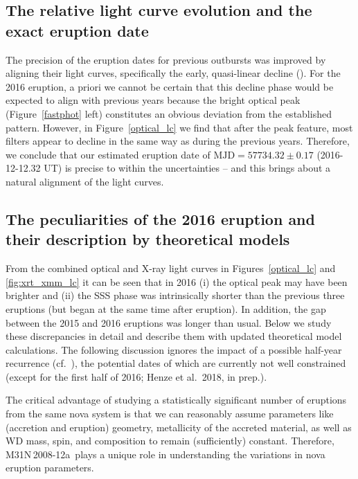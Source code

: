 \documentclass[twocolumn,tighten]{aastex6}
\def\nova{{M31N\,2008-12a~}}
\newcommand{\halfk}{\citetalias{2015A&A...582L...8H}}
\newcommand{\othreek}{\citetalias{2016ApJ...833..149D}}
\begin{document}
\subsection{The relative light curve evolution and the exact eruption date}\label{sec:disc_date}
\smallskip

The precision of the eruption dates for previous outbursts was improved by aligning their light curves, specifically the early, quasi-linear decline (\othreek). For the 2016 eruption, a priori we cannot be certain that this decline phase would be expected to align with previous years because the bright optical peak (Figure~\ref{fastphot} left) constitutes an obvious deviation from the established pattern. However, in Figure~\ref{optical_lc} we find that after the peak feature, most filters appear to decline in the same way as during the previous years. Therefore, we conclude that our estimated eruption date of $\mathrm{MJD}= 57734.32 \pm 0.17$ (2016-12-12.32 UT) is precise to within the uncertainties -- and this brings about a natural alignment of the light curves.

\subsection{The peculiarities of the 2016 eruption and their description by theoretical models}
\label{sec:disc_pecul}
From the combined optical and X-ray light curves in Figures~\ref{optical_lc} and \ref{fig:xrt_xmm_lc} it can be seen that in 2016 (i) the optical peak may have been brighter and (ii) the SSS phase was intrinsically shorter than the previous three eruptions (but began at the same time after eruption). In addition, the gap between the 2015 and 2016 eruptions was longer than usual. Below we study these discrepancies in detail and describe them with updated theoretical model calculations. The following discussion ignores the impact of a possible half-year recurrence (cf.~\halfk), the potential dates of which are currently not well constrained (except for the first half of 2016; Henze et al.\ 2018, in prep.).

The critical advantage of studying a statistically significant number of eruptions from the same nova system is that we can reasonably assume parameters like (accretion and eruption) geometry, metallicity of the accreted material, as well as WD mass, spin, and composition to remain (sufficiently) constant. Therefore, \nova plays a unique role in understanding the variations in nova eruption parameters. 
\end{document}
